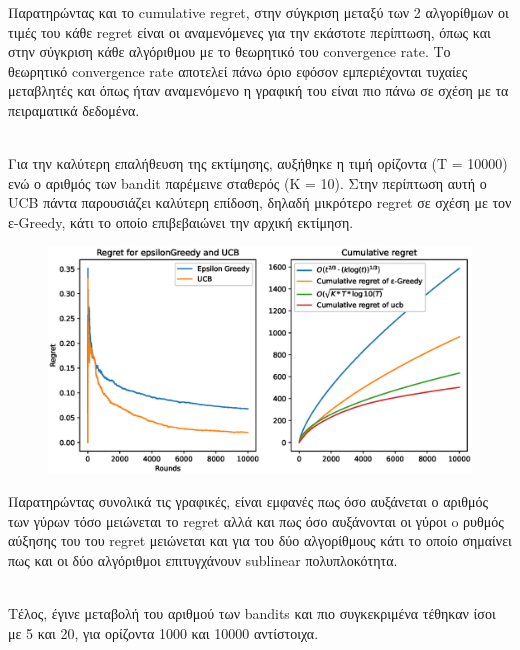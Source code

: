 \noindent
Παρατηρώντας και το cumulative regret, στην σύγκριση μεταξύ των 2 αλγορίθμων οι τιμές του κάθε regret είναι οι αναμενόμενες για την εκάστοτε περίπτωση, όπως και στην σύγκριση κάθε αλγόριθμου με το θεωρητικό του convergence rate. Το θεωρητικό convergence rate αποτελεί πάνω όριο εφόσον εμπεριέχονται τυχαίες μεταβλητές και όπως ήταν αναμενόμενο η γραφική του είναι πιο πάνω σε σχέση με τα πειραματικά δεδομένα.

\noindent\\
Για την καλύτερη επαλήθευση της εκτίμησης, αυξήθηκε η τιμή ορίζοντα (Τ = 10000) ενώ ο αριθμός των bandit παρέμεινε σταθερός (Κ = 10). Στην περίπτωση αυτή ο UCB πάντα παρουσιάζει καλύτερη επίδοση, δηλαδή μικρότερο regret σε σχέση με τον ε-Greedy, κάτι το οποίο επιβεβαιώνει την αρχική εκτίμηση. 


\begin{figure}[h]
	\centering
	\includegraphics[width=.6\linewidth]{Images/Regret10_10000.eps} 
	\label{fig:epsilon_10000}
\end{figure}


\noindent
Παρατηρώντας συνολικά τις γραφικές, είναι εμφανές πως όσο αυξάνεται ο αριθμός των γύρων τόσο μειώνεται το regret αλλά και πως όσο αυξάνονται οι γύροι o ρυθμός αύξησης του του regret μειώνεται και για του δύο αλγορίθμους κάτι το οποίο σημαίνει πως και οι δύο αλγόριθμοι επιτυγχάνουν sublinear πολυπλοκότητα.

\noindent\\
Τέλος, έγινε μεταβολή του αριθμού των bandits και πιο συγκεκριμένα τέθηκαν ίσοι με 5 και 20, για ορίζοντα 1000 και 10000 αντίστοιχα. 


